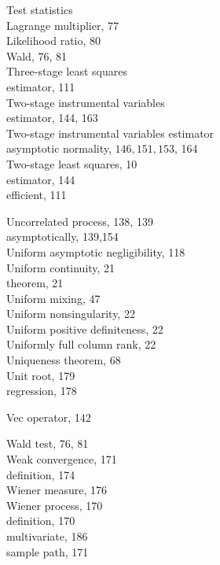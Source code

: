 \documentclass[10pt]{article}
\begin{document}
Test statistics\\
Lagrange multiplier, 77\\
Likelihood ratio, 80\\
Wald, 76, 81\\
Three-stage least squares\\
estimator, 111\\
Two-stage instrumental variables\\
estimator, 144, 163\\
Two-stage instrumental variables estimator\\
asymptotic normality, $146,151,153$, 164\\
Two-stage least squares, 10\\
estimator, 144\\
efficient, 111

Uncorrelated process, 138, 139\\
asymptotically, 139,154\\
Uniform asymptotic negligibility, 118\\
Uniform continuity, 21\\
theorem, 21\\
Uniform mixing, 47\\
Uniform nonsingularity, 22\\
Uniform positive definiteness, 22\\
Uniformly full column rank, 22\\
Uniqueness theorem, 68\\
Unit root, 179\\
regression, 178

Vec operator, 142

Wald test, 76, 81\\
Weak convergence, 171\\
definition, 174\\
Wiener measure, 176\\
Wiener process, 170\\
definition, 170\\
multivariate, 186\\
sample path, 171
\end{document}
